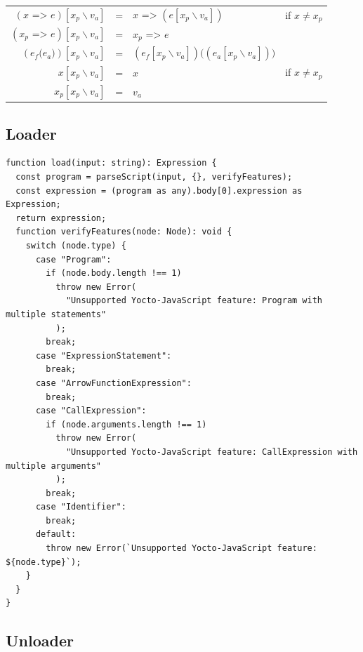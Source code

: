 \documentclass[12pt, oneside]{book}
\begin{document}
\begin{mdframed}[frametitle = {Advanced}]
\begin{tabular}{rcll}
$(x\texttt{ => }e)[x_{p} \backslash v_{a}]$ & = & $x\texttt{ => }(e[x_{p} \backslash v_{a}])$ & if $x \neq x_{p}$ \\
$(x_{p}\texttt{ => }e)[x_{p} \backslash v_{a}]$ & = & $x_{p}\texttt{ => }e$ & \\
$(e_{f}\texttt{(}e_{a}\texttt{)})[x_{p} \backslash v_{a}]$ & = & $(e_{f}[x_{p} \backslash v_{a}])\texttt{(}(e_{a}[x_{p} \backslash v_{a}])\texttt{)}$ & \\
$x[x_{p} \backslash v_{a}]$ & = & $x$ & if $x \neq x_{p}$ \\
$x_{p}[x_{p} \backslash v_{a}]$ & = & $v_{a}$ & \\
\end{tabular}
\end{mdframed}

\subsection{Loader}
\label{Step 0: Parser}


\begin{verbatim}
function load(input: string): Expression {
  const program = parseScript(input, {}, verifyFeatures);
  const expression = (program as any).body[0].expression as Expression;
  return expression;
  function verifyFeatures(node: Node): void {
    switch (node.type) {
      case "Program":
        if (node.body.length !== 1)
          throw new Error(
            "Unsupported Yocto-JavaScript feature: Program with multiple statements"
          );
        break;
      case "ExpressionStatement":
        break;
      case "ArrowFunctionExpression":
        break;
      case "CallExpression":
        if (node.arguments.length !== 1)
          throw new Error(
            "Unsupported Yocto-JavaScript feature: CallExpression with multiple arguments"
          );
        break;
      case "Identifier":
        break;
      default:
        throw new Error(`Unsupported Yocto-JavaScript feature: ${node.type}`);
    }
  }
}
\end{verbatim}

\subsection{Unloader}
\label{Step 0: Prettifier}
\end{document}
